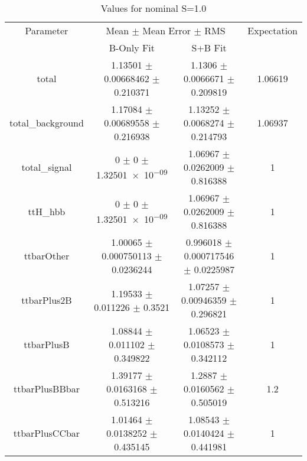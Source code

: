 \begin{table}
\centering
\caption{Values for nominal S=1.0}
\begin{tabular}{cccc}
\toprule
Parameter & \multicolumn{2}{c}{Mean $\pm$ Mean Error $\pm$ RMS} & Expectation\\
 & B-Only Fit & S+B Fit & \\
\midrule
total & \num{1.13501} $\pm$ \num{0.00668462} $\pm$ \num{0.210371} & \num{1.1306} $\pm$ \num{0.0066671} $\pm$ \num{0.209819} & \num{1.06619}\\
total\_background & \num{1.17084} $\pm$ \num{0.00689558} $\pm$ \num{0.216938} & \num{1.13252} $\pm$ \num{0.0068274} $\pm$ \num{0.214793} & \num{1.06937}\\
total\_signal & \num{0} $\pm$ \num{0} $\pm$ \num{1.32501e-09} & \num{1.06967} $\pm$ \num{0.0262009} $\pm$ \num{0.816388} & \num{1}\\
ttH\_hbb & \num{0} $\pm$ \num{0} $\pm$ \num{1.32501e-09} & \num{1.06967} $\pm$ \num{0.0262009} $\pm$ \num{0.816388} & \num{1}\\
ttbarOther & \num{1.00065} $\pm$ \num{0.000750113} $\pm$ \num{0.0236244} & \num{0.996018} $\pm$ \num{0.000717546} $\pm$ \num{0.0225987} & \num{1}\\
ttbarPlus2B & \num{1.19533} $\pm$ \num{0.011226} $\pm$ \num{0.3521} & \num{1.07257} $\pm$ \num{0.00946359} $\pm$ \num{0.296821} & \num{1}\\
ttbarPlusB & \num{1.08844} $\pm$ \num{0.011102} $\pm$ \num{0.349822} & \num{1.06523} $\pm$ \num{0.0108573} $\pm$ \num{0.342112} & \num{1}\\
ttbarPlusBBbar & \num{1.39177} $\pm$ \num{0.0163168} $\pm$ \num{0.513216} & \num{1.2887} $\pm$ \num{0.0160562} $\pm$ \num{0.505019} & \num{1.2}\\
ttbarPlusCCbar & \num{1.01464} $\pm$ \num{0.0138252} $\pm$ \num{0.435145} & \num{1.08543} $\pm$ \num{0.0140424} $\pm$ \num{0.441981} & \num{1}\\
\bottomrule
\end{tabular}
\end{table}